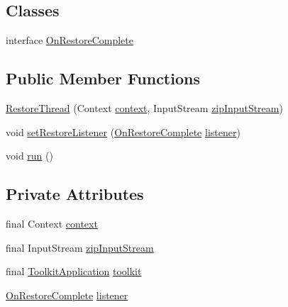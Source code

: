 \subsection*{Classes}
\begin{DoxyCompactItemize}
\item 
interface \hyperlink{interfaceorg_1_1buildmlearn_1_1toolkit_1_1utilities_1_1RestoreThread_1_1OnRestoreComplete}{On\+Restore\+Complete}
\end{DoxyCompactItemize}
\subsection*{Public Member Functions}
\begin{DoxyCompactItemize}
\item 
\hyperlink{classorg_1_1buildmlearn_1_1toolkit_1_1utilities_1_1RestoreThread_a616493f03b4bf433cf8a2d837f36640c}{Restore\+Thread} (Context \hyperlink{classorg_1_1buildmlearn_1_1toolkit_1_1utilities_1_1RestoreThread_a34c795343e29b452e4c65c58c352a0d6}{context}, Input\+Stream \hyperlink{classorg_1_1buildmlearn_1_1toolkit_1_1utilities_1_1RestoreThread_a967b084e55b9959508a62aaa7e0169a7}{zip\+Input\+Stream})
\item 
void \hyperlink{classorg_1_1buildmlearn_1_1toolkit_1_1utilities_1_1RestoreThread_a4c421d9766c5c39789275091df07b8b4}{set\+Restore\+Listener} (\hyperlink{interfaceorg_1_1buildmlearn_1_1toolkit_1_1utilities_1_1RestoreThread_1_1OnRestoreComplete}{On\+Restore\+Complete} \hyperlink{classorg_1_1buildmlearn_1_1toolkit_1_1utilities_1_1RestoreThread_ad1e4d47c924ee4d585ea837778ff1589}{listener})
\item 
void \hyperlink{classorg_1_1buildmlearn_1_1toolkit_1_1utilities_1_1RestoreThread_aecf498f9228f36af4544a1bd9de86175}{run} ()
\end{DoxyCompactItemize}
\subsection*{Private Attributes}
\begin{DoxyCompactItemize}
\item 
final Context \hyperlink{classorg_1_1buildmlearn_1_1toolkit_1_1utilities_1_1RestoreThread_a34c795343e29b452e4c65c58c352a0d6}{context}
\item 
final Input\+Stream \hyperlink{classorg_1_1buildmlearn_1_1toolkit_1_1utilities_1_1RestoreThread_a967b084e55b9959508a62aaa7e0169a7}{zip\+Input\+Stream}
\item 
final \hyperlink{classorg_1_1buildmlearn_1_1toolkit_1_1ToolkitApplication}{Toolkit\+Application} \hyperlink{classorg_1_1buildmlearn_1_1toolkit_1_1utilities_1_1RestoreThread_a0b220664bab60b9eea19188d8991c17c}{toolkit}
\item 
\hyperlink{interfaceorg_1_1buildmlearn_1_1toolkit_1_1utilities_1_1RestoreThread_1_1OnRestoreComplete}{On\+Restore\+Complete} \hyperlink{classorg_1_1buildmlearn_1_1toolkit_1_1utilities_1_1RestoreThread_ad1e4d47c924ee4d585ea837778ff1589}{listener}
\end{DoxyCompactItemize}
